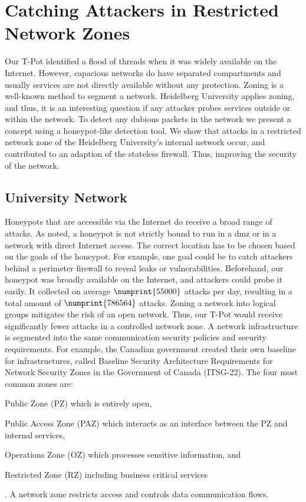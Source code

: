 \chapter{Catching Attackers in Restricted Network Zones}
\label{chap:concept}

Our T-Pot identified a flood of threads when it was widely available on the Internet.
However, capacious networks do have separated compartments and usually services are not directly available without any protection.
Zoning is a well-known method to segment a network.
Heidelberg University applies zoning, and thus, it is an interesting question if any attacker probes services outside or within the network.
To detect any dubious packets in the network we present a concept using a honeypot-like detection tool.
We show that attacks in a restricted network zone of the Heidelberg University's internal network occur, and contributed to an adaption of the stateless firewall.
Thus, improving the security of the network.

\section{University Network}

Honeypots that are accessible via the Internet do receive a broad range of attacks.
As \citet{Spitzner2003} noted, a honeypot is not strictly bound to run in a \ac{dmz} or in a network with direct Internet access.
The correct location has to be chosen based on the goals of the honeypot.
For example, one goal could be to catch attackers behind a perimeter firewall to reveal leaks or vulnerabilities.
Beforehand, our honeypot was broadly available on the Internet, and attackers could probe it easily.
It collected on average $\numprint{55000}$ attacks per day, resulting in a total amount of $\numprint{786564}$ attacks.
Zoning a network into logical groups mitigates the risk of an open network.
Thus, our T-Pot would receive significantly fewer attacks in a controlled network zone.
A network infrastructure is segmented into the same communication security policies and security requirements.
For example, the Canadian government created their own baseline for infrastructures, called Baseline Security Architecture Requirements for Network Security Zones in the Government of Canada (ITSG-22).
The four most common zones are:
\begin{enumerate*}[label=(\roman*)]
    \item Public Zone (PZ) which is entirely open,
    \item Public Access Zone (PAZ) which interacts as an interface between the PZ and internal services,
    \item Operations Zone (OZ) which processes sensitive information, and
    \item Restricted Zone (RZ) including business critical services
\end{enumerate*}.
A network zone restricts access and controls data communication flows. \cite{csec2021}

